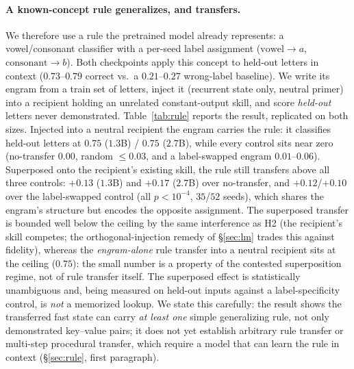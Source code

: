 \documentclass[11pt]{article}
\theoremstyle{definition}
\begin{document}
\paragraph{A known-concept rule generalizes, and transfers.}
We therefore use a rule the pretrained model already represents: a vowel/consonant classifier with a per-seed label assignment ($\text{vowel}\!\to\!a$, $\text{consonant}\!\to\!b$). Both checkpoints apply this concept to held-out letters in context ($0.73$--$0.79$ correct vs.\ a $0.21$--$0.27$ wrong-label baseline). We write its engram from a train set of letters, inject it (recurrent state only, neutral primer) into a recipient holding an unrelated constant-output skill, and score \emph{held-out} letters never demonstrated. Table~\ref{tab:rule} reports the result, replicated on both sizes. Injected into a neutral recipient the engram carries the rule: it classifies held-out letters at $0.75$ ($1.3$B) / $0.75$ ($2.7$B), while every control sits near zero (no-transfer $0.00$, random $\le 0.03$, and a label-swapped engram $0.01$--$0.06$). Superposed onto the recipient's existing skill, the rule still transfers above all three controls: $+0.13$ ($1.3$B) and $+0.17$ ($2.7$B) over no-transfer, and $+0.12$/$+0.10$ over the label-swapped control (all $p<10^{-4}$, $35$/$52$ seeds), which shares the engram's structure but encodes the opposite assignment. The superposed transfer is bounded well below the ceiling by the same interference as H2 (the recipient's skill competes; the orthogonal-injection remedy of \S\ref{sec:lm} trades this against fidelity), whereas the \emph{engram-alone} rule transfer into a neutral recipient sits at the ceiling ($0.75$): the small number is a property of the contested superposition regime, not of rule transfer itself. The superposed effect is statistically unambiguous and, being measured on held-out inputs against a label-specificity control, is \emph{not} a memorized lookup. We state this carefully: the result shows the transferred fast state can carry \emph{at least one} simple generalizing rule, not only demonstrated key--value pairs; it does not yet establish arbitrary rule transfer or multi-step procedural transfer, which require a model that can learn the rule in context (\S\ref{sec:rule}, first paragraph).
\end{document}

